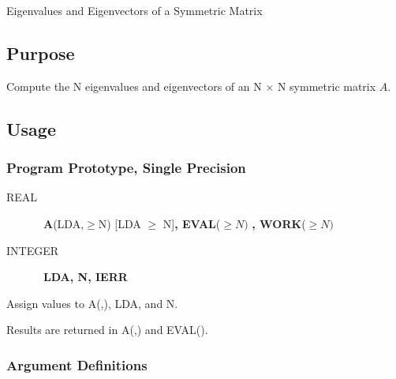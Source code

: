 \documentclass[twoside]{MATH77}
\begin{document}
 Eigenvalues and Eigenvectors of a Symmetric Matrix


\subsection{Purpose}

Compute the N eigenvalues and eigenvectors of an N $\times $ N symmetric matrix $A$.

\subsection{Usage}

\subsubsection{Program Prototype, Single Precision}

\begin{description}
\item[REAL]  \ {\bf A}(LDA,$\geq $N) [LDA $\geq $ N]{\bf , EVAL}($\geq N)$%
{\bf ,\newline
WORK}($\geq N)$

\item[INTEGER]  \ {\bf LDA, N, IERR}
\end{description}

Assign values to A(,), LDA, and N.

\begin{center}
\end{center}

Results are returned in A(,) and EVAL().

\subsubsection{Argument Definitions}
\end{document}
